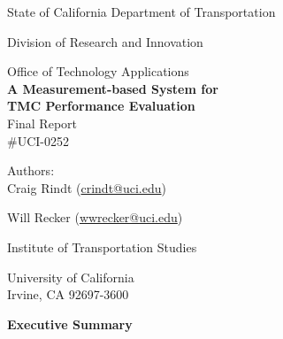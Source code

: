 \documentclass[12pt]{report}
\renewcommand{\headrulewidth}{0.4pt}
\renewcommand{\footrulewidth}{0pt}
\begin{document}
\begin{titlepage}
  
  \begin{center}
    {\Large
      State of California Department of Transportation

      Division of Research and Innovation

      Office of Technology Applications\\[0.5in]



      {\Huge \textbf{A Measurement-based System for \\[0.25em]TMC Performance Evaluation}}\\[0.5in]

      Final Report\\[0.25em]
      \#UCI-0252
      
      \vfill
      
      Authors:\\[0.5em]

      Craig Rindt (\url{crindt@uci.edu})

      Will Recker (\url{wwrecker@uci.edu})

      Institute of Transportation Studies

      University of California\\[0.5em]

      Irvine, CA 92697-3600
    }
  \end{center}

\end{titlepage}






\fancypagestyle{plain}{%
  \fancyhf{} %
  \fancyfoot[C]{\thepage} %
  \renewcommand{\headrulewidth}{0pt}
  \renewcommand{\footrulewidth}{0pt}
}


\setcounter{page}{3}




\clearpage

\pagestyle{fancyplain}

{\noindent\huge\bfseries\centering Executive Summary\par\nobreak
  \vskip 20pt}
\label{execsum}

\end{document}
